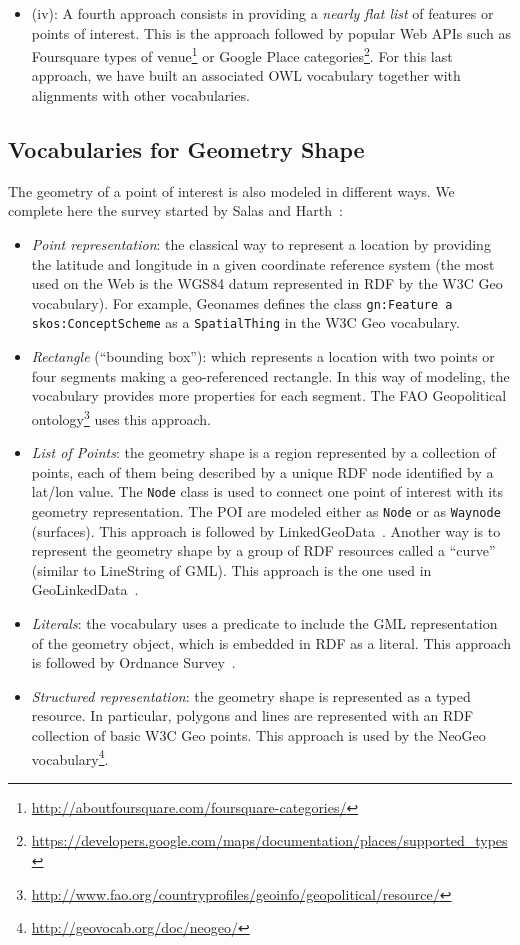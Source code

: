 \documentclass[a4paper,11pt]{report}
\begin{document}
\begin{itemize}
  \item (iv): A fourth approach consists in providing a \textit{nearly flat list} of features or points of interest. This is the approach followed by popular Web APIs such as Foursquare types of venue\footnote{\url{http://aboutfoursquare.com/foursquare-categories/}} or Google Place categories\footnote{\url{https://developers.google.com/maps/documentation/places/supported_types}}. For this last approach, we have built an associated OWL vocabulary together with alignments with other vocabularies.
\end{itemize}

\subsection{Vocabularies for Geometry Shape}
The geometry of a point of interest is also modeled in different ways. We complete here the survey started by Salas and Harth~\cite{Salas2011}:
\begin{itemize}
  \item \textit{Point representation}: the classical way to represent a location by providing the latitude and longitude in a given coordinate reference system (the most used on the Web is the WGS84 datum represented in RDF by the W3C Geo vocabulary). For example, Geonames defines the class \texttt{gn:Feature a skos:ConceptScheme} as a \texttt{SpatialThing} in the W3C Geo vocabulary.
  \item \textit{Rectangle} (``bounding box''): which represents a location with two points or four segments making a geo-referenced rectangle. In this way of modeling, the vocabulary provides more properties for each segment. The FAO Geopolitical ontology\footnote{\url{http://www.fao.org/countryprofiles/geoinfo/geopolitical/resource/}} uses this approach.
  \item \textit{List of Points}: the geometry shape is a region represented by a collection of points, each of them being described by a unique RDF node identified by a lat/lon value. The \texttt{Node} class is used to connect one point of interest with its geometry representation. The POI are modeled either as \texttt{Node} or as \texttt{Waynode} (surfaces). This approach is followed by LinkedGeoData~\cite{linkedgeodata}. Another way is to represent the geometry shape by a group of RDF resources called a ``curve'' (similar to LineString of GML). This approach is the one used in GeoLinkedData~\cite{deLeon2010}.
   \item \textit{Literals}: the vocabulary uses a predicate to include the GML representation of the geometry object, which is embedded in RDF as a literal. This approach is followed by Ordnance Survey~\cite{Goodwin2008}.
  \item \textit{Structured representation}: the geometry shape is represented as a typed resource. In particular, polygons and lines are represented with an RDF collection of basic W3C Geo points. This approach is used by the NeoGeo vocabulary\footnote{\url{http://geovocab.org/doc/neogeo/}}.
\end{itemize}
\end{document}
